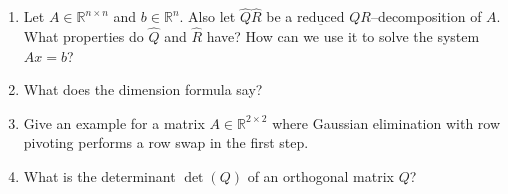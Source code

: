 \begin{enumerate}
	\item Let $A\in\mathbb{R}^{n \times n}$ and $b \in \mathbb{R}^n$. Also let $\widehat{Q}\widehat{R}$ be a $\underline{\text{reduced}}$ $QR$--decomposition of $A$. What properties do $\widehat{Q}$ and $\widehat{R}$ have? How can we use it to solve the system $Ax = b$?	
		\item What does the dimension formula say?
		\item Give an example for a matrix $A \in \mathbb{R}^{2 \times 2}$ where Gaussian elimination with row pivoting performs a row swap in the first step.
		\item What is the determinant $\det(Q)$ of an orthogonal matrix $Q$?
\end{enumerate}